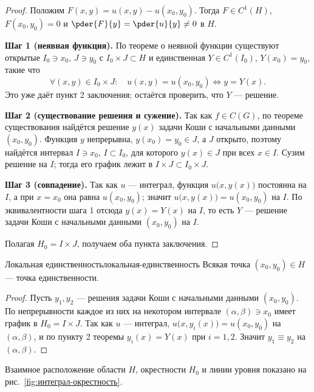 \begin{proof}
	Положим $F(x,y) = u(x,y) - u(x_0,y_0)$. Тогда $F \in C^1(H)$,
	$F(x_0,y_0) = 0$ и $\pder{F}{y} = \pder{u}{y} \neq 0$ в $H$.

	\medskip
	\textbf{Шаг 1 (неявная функция).} По теореме о неявной функции существуют
	открытые $I_0 \ni x_0$, $J \ni y_0$ с $I_0 \times J \subset H$ и единственная
	$Y \in C^1(I_0)$, $Y(x_0) = y_0$, такие что
	\[
	\forall (x,y) \in I_0 \times J \colon \quad
	u(x,y) = u(x_0,y_0) \iff y = Y(x).
	\]
	Это уже даёт пункт 2 заключения; остаётся проверить, что $Y$ --- решение.

	\medskip
	\textbf{Шаг 2 (существование решения и сужение).} Так как $f \in C(G)$, по
	теореме существования найдётся решение $y(x)$ задачи Коши с начальными
	данными $(x_0,y_0)$. Функция $y$ непрерывна, $y(x_0) = y_0 \in J$, а $J$
	открыто, поэтому найдётся интервал $I \ni x_0$, $I \subset I_0$, для которого
	$y(x) \in J$ при всех $x \in I$. Сузим решение на $I$; тогда его график лежит
	в $I \times J \subset I_0 \times J$.

	\medskip
	\textbf{Шаг 3 (совпадение).} Так как $u$ --- интеграл, функция
	$u\bigl(x,y(x)\bigr)$ постоянна на $I$, а при $x = x_0$ она равна
	$u(x_0,y_0)$; значит $u\bigl(x,y(x)\bigr) = u(x_0,y_0)$ на $I$. По
	эквивалентности шага 1 отсюда $y(x) = Y(x)$ на $I$, то есть $Y$ ---
	решение задачи Коши с начальными данными $(x_0,y_0)$ на $I$.

	Полагая $H_0 = I \times J$, получаем оба пункта заключения.
\end{proof}

\begin{Corollary}{Локальная единственность}{локальная-единственность}
	Всякая точка $(x_0,y_0) \in H$ --- точка единственности.
\end{Corollary}

\begin{Addon}
	\begin{proof}
		Пусть $y_1, y_2$ --- решения задачи Коши с начальными данными $(x_0,y_0)$.
		По непрерывности каждое из них на некотором интервале $(\alpha,\beta) \ni x_0$
		имеет график в $H_0 = I \times J$. Так как $u$ --- интеграл,
		$u\bigl(x,y_i(x)\bigr) = u(x_0,y_0)$ на $(\alpha,\beta)$, и по пункту 2
		теоремы $y_i(x) = Y(x)$ при $i = 1,2$. Значит $y_1 \equiv y_2$ на
		$(\alpha,\beta)$.
	\end{proof}

	Взаимное расположение области $H$, окрестности $H_0$ и линии уровня показано
	на рис.~\ref{fig:интеграл-окрестность}.
\end{Addon}

